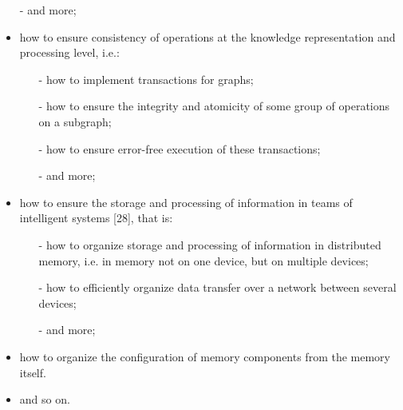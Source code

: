\documentclass{article}
\begin{document}
\begin{multicols}{2}
\begin{itemize}
\begin{itemize}
\item[-]and more;

\end{itemize}
\end{itemize}



\begin{itemize}
\itemsep = 0mm
\item how to ensure consistency of operations at the
knowledge representation and processing level, i.e.:

\begin{itemize}
\itemsep=0mm
\item[-]how to implement transactions for graphs;

\item[-]how to ensure the integrity and atomicity of some
group of operations on a subgraph;


\item[-]how to ensure error-free execution of these transactions;
\item[-]and more;
\end{itemize}
\end{itemize}




\begin{itemize}
\itemsep = 0mm
\item how to ensure the storage and processing of information in teams of intelligent systems [28], that is:

\begin{itemize}
\itemsep=0mm
\item[-]how to organize storage and processing of information in distributed memory, i.e. in memory not
on one device, but on multiple devices;

\item[-]how to efficiently organize data transfer over a
network between several devices;

\item[-]and more;
\end{itemize}
\end{itemize}

\begin{itemize}
\itemsep = 0mm
\item how to organize the configuration of memory components from the memory itself.
\item and so on.

\end{itemize}


\end{multicols}
\end{document}
